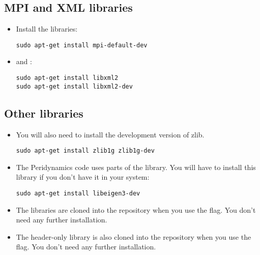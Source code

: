 \documentclass[11pt,fleqn]{book} %
\begin{document}
\subsection{MPI and XML libraries}
\begin{itemize}
  \item Install the  libraries:
\begin{lstlisting}[backgroundcolor=\color{background}]
sudo apt-get install mpi-default-dev
\end{lstlisting}

  \item and :
\begin{lstlisting}[backgroundcolor=\color{background}]
sudo apt-get install libxml2
sudo apt-get install libxml2-dev
\end{lstlisting}
\end{itemize}

\subsection{Other libraries}
\begin{itemize}
  \item You will also need to install the development version of zlib.
\begin{lstlisting}[backgroundcolor=\color{background}]
sudo apt-get install zlib1g zlib1g-dev
\end{lstlisting}

  \item The Peridynamics code uses parts of the  library. You will have to install 
        this library if you don't have it in your system:
\begin{lstlisting}[backgroundcolor=\color{background}]
sudo apt-get install libeigen3-dev
\end{lstlisting}

  \item The  libraries are cloned into the repository when you use
        the  flag.  You don't need any further installation.

  \item The  header-only library is also cloned into the repository when you use
        the  flag.  You don't need any further installation.
\end{itemize}
\end{document}

